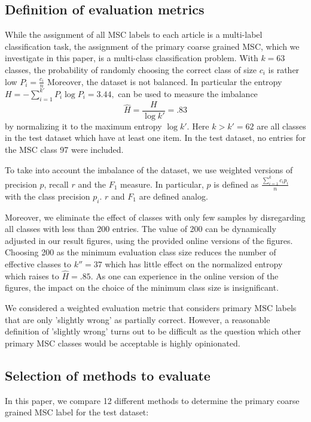 \subsection{Definition of evaluation metrics}
While the assignment of all MSC labels to each article is a multi-label classification task, the assignment of the primary coarse grained MSC, which we investigate in this paper, is a multi-class classification problem.
With $k=63$ classes, the probability of randomly choosing the correct class of size $c_i$ is rather low
\(
P_i=\frac{c_i}{n}
\)
Moreover, the dataset is not balanced. In particular the entropy \(
H=-\sum_{i=1}^{k'}P_i\log P_i=3.44,
\)
can be used to measure the imbalance \[
\hat{H}=\frac{H}{\log k'}=.83
\]
by normalizing it to the maximum entropy $\log k'.$
Here $k>k'=62$ are all classes in the test dataset which have at least one item. 
In the test dataset, no entries for the MSC class 97 were included.

To take into account the imbalance of the dataset, we use weighted versions of precision $p$, recall $r$ and the $F_1$ measure. In particular, $p$ is defined as \(
\frac{\sum_{i=1}^{k}c_ip_i}{n}
\) with the class precision $p_i$.
$r$ and $F_1$ are defined analog.

Moreover, we eliminate the effect of classes with only few samples by disregarding all classes with less than 200 entries.
The value of 200 can be dynamically adjusted in our result figures, using the provided online versions of the figures.
Choosing 200 as the minimum evaluation class size reduces the number of effective classes to $k''=37$ which has little effect on the normalized entropy which raises to $\hat{H}=.85.$
As one can experience in the online version of the figures, the impact on the choice of the minimum class size is insignificant.

We considered a weighted evaluation metric that considers primary MSC labels that are only 'slightly wrong' as partially correct.
However, a reasonable definition of 'slightly wrong' turns out to be difficult as the question which other primary MSC classes would be acceptable is highly opinionated.
\subsection{Selection of methods to evaluate}


In this paper, we compare 12 different methods to determine the primary coarse grained MSC label for the test dataset:

